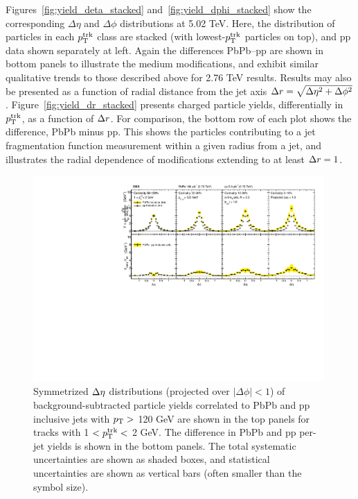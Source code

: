 Figures~\ref{fig:yield_deta_stacked} and~\ref{fig:yield_dphi_stacked} show the corresponding $\Delta\eta$ and $\Delta\phi$ distributions at 5.02 TeV.  Here, the distribution of particles in each $p_{\rm T}^{\rm trk}$ class are stacked (with lowest-$p_{\rm T}^{\rm trk}$ particles on top), and pp data shown separately at left.  Again the differences PbPb--pp are shown in bottom panels to illustrate the medium modifications, and exhibit similar qualitative trends to those described above for 2.76 TeV results.  Results may also be presented as a function of radial distance from the jet axis $\protect\Delta r = \sqrt{\Delta\eta^{2}+\Delta\phi^{2}}$.  Figure~\ref{fig:yield_dr_stacked} presents charged particle yields, differentially in $p_{\rm T}^{\rm trk}$, as a function of $\protect\Delta r$.  For comparison, the bottom row of each plot shows the difference, PbPb minus pp.  This shows the particles contributing to a jet fragmentation function measurement within a given radius from a jet, and illustrates the radial dependence of modifications extending to at least $\protect\Delta r = 1$.  


\begin{figure}[hbt] 
\begin{center} 
\includegraphics[width=0.99\textwidth]{figures/Results/PAS_Figure_3_TrkPt1_TrkPt2.pdf}
\caption[Inclusive jet $\Delta\eta$ correlations for tracks with $1 < p_{\rm T}^{\rm trk} < 2$ GeV at 2.76 TeV]{Symmetrized $\protect\Delta\eta$ distributions (projected over $|\Delta\phi| < 1$) of background-subtracted particle yields correlated to PbPb and pp inclusive jets with $p_{\rm T}>$ 120 GeV are shown in the top panels for tracks with 1 $ < p_{\rm T}^{\rm trk} < $ 2 GeV.  The difference in PbPb and pp per-jet yields is shown in the bottom panels. The total systematic uncertainties are shown as shaded boxes, and statistical uncertainties are shown as vertical bars (often smaller than the symbol size).}
\label{fig:Inclusive_dEta1}
\end{center} 
\end{figure} 

